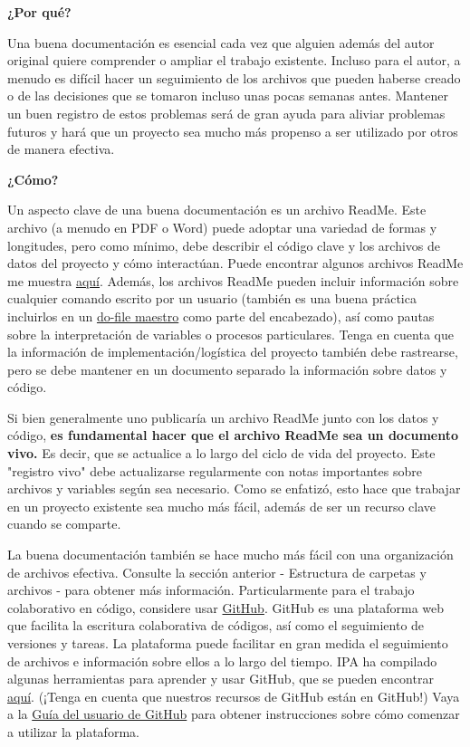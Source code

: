 \documentclass[11pt,en]{elegantpaper}
\begin{document}
\begin{itemize}
\textbf{¿Por qué?}

Una buena documentación es esencial cada vez que alguien además del autor original quiere comprender o ampliar el trabajo existente. Incluso para el autor, a menudo es difícil hacer un seguimiento de los archivos que pueden haberse creado o de las decisiones que se tomaron incluso unas pocas semanas antes. Mantener un buen registro de estos problemas será de gran ayuda para aliviar problemas futuros y hará que un proyecto sea mucho más propenso a ser utilizado por otros de manera efectiva.

\textbf{¿Cómo?}

Un aspecto clave de una buena documentación es un archivo ReadMe. Este archivo (a menudo en PDF o Word) puede adoptar una variedad de formas y longitudes, pero como mínimo, debe describir el código clave y los archivos de datos del proyecto y cómo interactúan. Puede encontrar algunos archivos ReadMe me muestra \href{http://www.poverty-action.org/research-transparency/example-readme-files}{aquí}. Además, los archivos ReadMe pueden incluir información sobre cualquier comando escrito por un usuario (también es una buena práctica incluirlos en un \href{http://www.poverty-action.org/research-transparency/example-master}{do-file maestro} como parte del encabezado), así como pautas sobre la interpretación de variables o procesos particulares. Tenga en cuenta que la información de implementación/logística del proyecto también debe rastrearse, pero se debe mantener en un documento separado la información sobre datos y código.

Si bien generalmente uno publicaría un archivo ReadMe junto con los datos y código, \textbf{es fundamental hacer que el archivo ReadMe sea un documento vivo.} Es decir, que se actualice a lo largo del ciclo de vida del proyecto. Este "registro vivo" debe actualizarse regularmente con notas importantes sobre archivos y variables según sea necesario. Como se enfatizó, esto hace que trabajar en un proyecto existente sea mucho más fácil, además de ser un recurso clave cuando se comparte.

La buena documentación también se hace mucho más fácil con una organización de archivos efectiva. Consulte la sección anterior - Estructura de carpetas y archivos - para obtener más información. Particularmente para el trabajo colaborativo en código, considere usar \href{https://github.com/}{GitHub}. GitHub es una plataforma web que facilita la escritura colaborativa de códigos, así como el seguimiento de versiones y tareas. La plataforma puede facilitar en gran medida el seguimiento de archivos e información sobre ellos a lo largo del tiempo. IPA ha compilado algunas herramientas para aprender y usar GitHub, que se pueden encontrar \href{https://github.com/PovertyAction/github-training}{aquí}. (¡Tenga en cuenta que nuestros recursos de GitHub están en GitHub!) Vaya a la \href{https://github.com/PovertyAction/github-training/blob/master/resources/GitHub\%20User\%20Guide.md}{Guía del usuario de GitHub} para obtener instrucciones sobre cómo comenzar a utilizar la plataforma.


\end{itemize}
\end{document}
